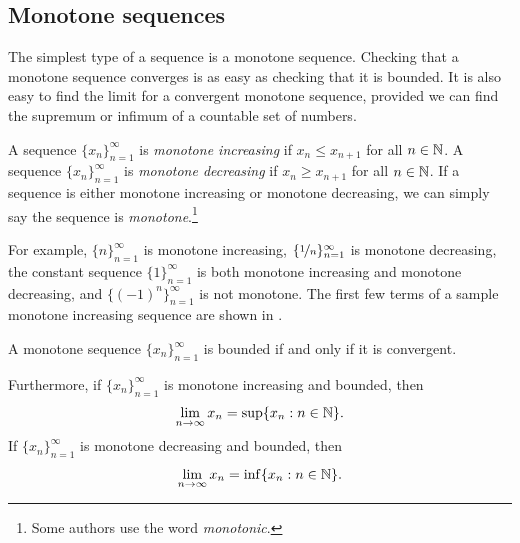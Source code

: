 \subsection{Monotone sequences}

The simplest type of a sequence is a monotone sequence.  Checking that
a monotone sequence converges is as easy as checking that it is bounded.
It is also easy to find
the limit for a convergent
monotone sequence, provided we can find the supremum or infimum
of a countable set of numbers.

\begin{defn}
A sequence $\{ x_n \}_{n=1}^\infty$ is \emph{monotone increasing} if $x_n \leq x_{n+1}$ for all $n \in {\mathbb{N}}$.  
%
A sequence $\{ x_n \}_{n=1}^\infty$ is \emph{monotone decreasing} if $x_n \geq x_{n+1}$ for all $n \in {\mathbb{N}}$.  
%
If a sequence is either monotone increasing or monotone decreasing, we
can simply say the sequence is \emph{monotone}.\footnote{Some
authors use the word \emph{monotonic}.}
\end{defn}

For example,
$\{ n \}_{n=1}^\infty$ is monotone increasing,
$\{ \nicefrac{1}{n} \}_{n=1}^\infty$ is monotone decreasing,
the constant sequence $\{ 1 \}_{n=1}^\infty$ is both monotone increasing and monotone
decreasing, and $\bigl\{ {(-1)}^n \bigr\}_{n=1}^\infty$ is not monotone.
The first few terms of a sample monotone increasing sequence
are shown in 
.

\begin{myfigureht}
\caption{First few terms of a monotone increasing sequence as a
graph.\label{figsequenceincreasing}}
\end{myfigureht}

\begin{thm} \label{thm:monotoneconv}
%
A monotone sequence $\{ x_n \}_{n=1}^\infty$ is bounded if and only if it is convergent.

Furthermore, if $\{ x_n \}_{n=1}^\infty$ is monotone increasing and bounded, then
\begin{equation*}
\lim_{n\to \infty} x_n = \sup \{ x_n : n \in {\mathbb{N}} \} .
\end{equation*}
If $\{ x_n \}_{n=1}^\infty$ is monotone decreasing and bounded, then
\begin{equation*}
\lim_{n\to \infty} x_n = \inf \{ x_n : n \in {\mathbb{N}} \} .
\end{equation*}
\end{thm}

